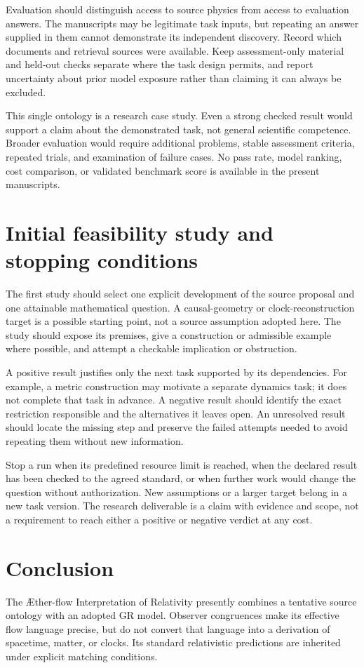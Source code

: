 \documentclass[11pt,oneside]{report}
\newcommand{\Aflow}{\AE{}ther-flow}
\theoremstyle{remark}
\numberwithin{definition}{chapter}
\numberwithin{proposition}{chapter}
\numberwithin{remark}{chapter}
\begin{document}
Evaluation should distinguish access to source physics from access to evaluation answers. The manuscripts may be legitimate task inputs, but repeating an answer supplied in them cannot demonstrate its independent discovery. Record which documents and retrieval sources were available. Keep assessment-only material and held-out checks separate where the task design permits, and report uncertainty about prior model exposure rather than claiming it can always be excluded.

This single ontology is a research case study. Even a strong checked result would support a claim about the demonstrated task, not general scientific competence. Broader evaluation would require additional problems, stable assessment criteria, repeated trials, and examination of failure cases. No pass rate, model ranking, cost comparison, or validated benchmark score is available in the present manuscripts.

\section{Initial feasibility study and stopping conditions}
The first study should select one explicit development of the source proposal and one attainable mathematical question. A causal-geometry or clock-reconstruction target is a possible starting point, not a source assumption adopted here. The study should expose its premises, give a construction or admissible example where possible, and attempt a checkable implication or obstruction.

A positive result justifies only the next task supported by its dependencies. For example, a metric construction may motivate a separate dynamics task; it does not complete that task in advance. A negative result should identify the exact restriction responsible and the alternatives it leaves open. An unresolved result should locate the missing step and preserve the failed attempts needed to avoid repeating them without new information.

Stop a run when its predefined resource limit is reached, when the declared result has been checked to the agreed standard, or when further work would change the question without authorization. New assumptions or a larger target belong in a new task version. The research deliverable is a claim with evidence and scope, not a requirement to reach either a positive or negative verdict at any cost.

\section{Conclusion}
The \Aflow{} Interpretation of Relativity presently combines a tentative source ontology with an adopted GR model. Observer congruences make its effective flow language precise, but do not convert that language into a derivation of spacetime, matter, or clocks. Its standard relativistic predictions are inherited under explicit matching conditions.
\end{document}
